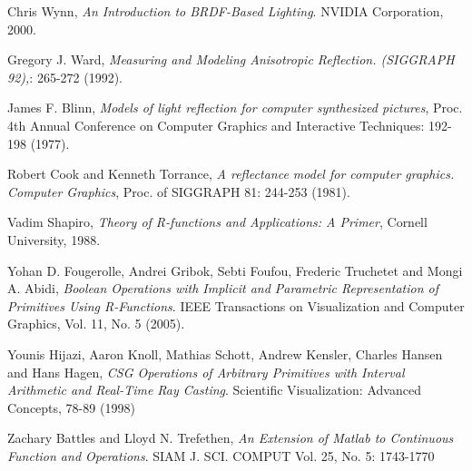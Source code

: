 \documentclass[11pt]{amsart}
\theoremstyle{definition}
\begin{document}
\begin{thebibliography}{9}
Chris Wynn,
\emph{An Introduction to BRDF-Based Lighting}.
NVIDIA Corporation, 2000.

Gregory J. Ward, 
\emph{Measuring and Modeling Anisotropic Reflection. (SIGGRAPH 92),}: 265-272 (1992).

James F. Blinn,  
\emph{Models of light reflection for computer synthesized pictures}, Proc. 4th
Annual Conference on Computer Graphics and Interactive Techniques: 192-198
(1977). 

Robert Cook and Kenneth Torrance,
\emph{A reflectance model for computer graphics. Computer Graphics}, Proc. of SIGGRAPH 81: 244-253 (1981).  

Vadim Shapiro,
\emph{Theory of R-functions and Applications: A Primer}, Cornell University, 1988.

Yohan D. Fougerolle, Andrei Gribok, Sebti Foufou, Frederic Truchetet and Mongi A. Abidi,
\emph{Boolean Operations with Implicit and Parametric Representation of Primitives Using R-Functions}.
IEEE Transactions on Visualization and Computer Graphics, Vol. 11, No. 5 (2005).

Younis Hijazi, Aaron Knoll, Mathias Schott, Andrew Kensler, Charles Hansen and Hans Hagen,
\emph{CSG Operations of Arbitrary Primitives with Interval Arithmetic and Real-Time Ray Casting}.
Scientific Visualization: Advanced Concepts, 78-89 (1998) 
	
 
  Zachary Battles and Lloyd N. Trefethen,
  \emph{An Extension of Matlab to Continuous Function and Operations}.
  SIAM J. SCI. COMPUT Vol. 25, No. 5: 1743-1770 
 



	



\end{thebibliography}


%
\end{document}
